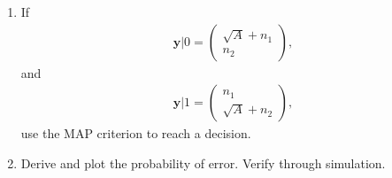 \documentclass[journal,12pt,twocolumn]{IEEEtran}
\renewcommand\thesection{\arabic{section}}
\begin{document}
\begin{enumerate}[label=\thesection.\arabic*
,ref=\thesection.\theenumi]
%
%
\item
If 
\begin{align}
\mathbf{y}|0 = 
\begin{pmatrix*}
\sqrt{A} + n_{1}\\
n_{2}
\end{pmatrix*},
\end{align}
and 
\begin{align}
\mathbf{y}|1 = 
\begin{pmatrix*}
n_{1}\\
\sqrt{A} + n_{2}
\end{pmatrix*},
\end{align}
use the MAP criterion to reach a decision.

\item
Derive and plot the probability of error.  Verify through simulation.

%
\end{enumerate}
\end{document}
